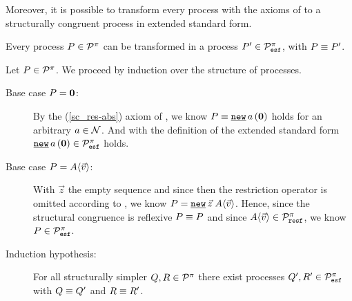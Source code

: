 Moreover, it is possible to transform every process with the axioms of  to a structurally congruent process in extended standard form.

\begin{lemma}
\label{lem_extended_standard_form}
Every process $P\in\mathcal P^{\pi}$ can be transformed in a process $P'\in\mathcal P^{\pi}_{\mathtt{esf}}$, with $P\equiv{}{}P'$.
\end{lemma}
\begin{prf}
Let $P\in\mathcal P^{\pi}$. We proceed by induction over the structure of processes.
\begin{description}
\item[Base case $P=\mathbf{0}$:] By the (\ref{sc_res-abs}) axiom of , we know $\struct{P}{\procres[()]{a}{\proczero}}$ holds for an arbitrary $a\in\mathcal N$. And with the definition of the extended standard form $\procres[()]{a}{\proczero}\in\procsesf$ holds.%

\item[Base case $P=A\langle\vec{v}\rangle$:] With $\vec{z}$ the empty sequence and since then the restriction operator is omitted according to , we know $P=\procres{\vec{z}}{\proccall{A}{\vec{v}}}$. Hence, since the structural congruence is reflexive $P\equiv{}{}P$ and since $A\langle\vec{v}\rangle\in\mathcal P^{\pi}_{\mathtt{resf}}$, we know $P\in\mathcal P^{\pi}_{\mathtt{esf}}$.

\item[Induction hypothesis:] For all structurally simpler $Q,R\in\mathcal P^{\pi}$ there exist processes $Q',R'\in\mathcal P^{\pi}_{\mathtt{esf}}$ with $Q\equiv{}{}Q'$ and $R\equiv{}{}R'$.


\end{description}
\end{prf}

